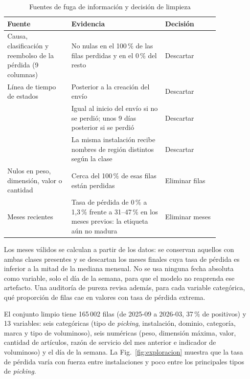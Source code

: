 \documentclass[conference]{IEEEtran}
\newcommand{\col}[1]{\texttt{\detokenize{#1}}}
\begin{document}
\begin{table}[htbp]
\caption{Fuentes de fuga de información y decisión de limpieza}
\label{tab:limpieza}
\centering
\footnotesize
\begin{tabular}{>{\raggedright\arraybackslash}p{0.26\linewidth}>{\raggedright\arraybackslash}p{0.38\linewidth}>{\raggedright\arraybackslash}p{0.22\linewidth}}
\toprule
\textbf{Fuente} & \textbf{Evidencia} & \textbf{Decisión}\\
\midrule
Causa, clasificación y reembolso de la pérdida (9 columnas) & No nulas en el 100\,\% de las filas perdidas y en el 0\,\% del resto & Descartar\\
Línea de tiempo de estados & Posterior a la creación del envío & Descartar\\
\col{DATEPARAMETER} & Igual al inicio del envío si no se perdió; unos 9 días posterior si se perdió & Descartar\\
\col{LG_REGION} & La misma instalación recibe nombres de región distintos según la clase & Descartar\\
Nulos en peso, dimensión, valor o cantidad & Cerca del 100\,\% de esas filas están perdidas & Eliminar filas\\
Meses recientes & Tasa de pérdida de 0\,\% a 1,3\,\% frente a 31--47\,\% en los meses previos: la etiqueta aún no madura & Eliminar meses\\
\bottomrule
\end{tabular}
\end{table}

Los meses válidos se calculan a partir de los datos: se conservan aquellos con
ambas clases presentes y se descartan los meses finales cuya tasa de pérdida
es inferior a la mitad de la mediana mensual. No se usa ninguna fecha absoluta
como variable, solo el día de la semana, para que el modelo no reaprenda ese
artefacto. Una auditoría de pureza revisa además, para cada variable
categórica, qué proporción de filas cae en valores con tasa de pérdida extrema.

El conjunto limpio tiene 165\,002 filas (de 2025-09 a 2026-03, 37\,\% de
positivos) y 13 variables: seis categóricas (tipo de \textit{picking},
instalación, dominio, categoría, marca y tipo de voluminoso), seis numéricas
(peso, dimensión máxima, valor, cantidad de artículos, razón de servicio del
mes anterior e indicador de voluminoso) y el día de la semana. La
Fig.~\ref{fig:exploracion} muestra que la tasa de pérdida varía con fuerza
entre instalaciones y poco entre los principales tipos de \textit{picking}.
\end{document}
